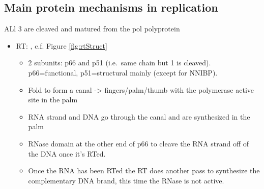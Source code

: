 \documentclass[
  11pt,
  twoside]{scrbook}
\begin{document}
\hypertarget{main-protein-mechanisms-in-replication}{%
\subsection{Main protein mechanisms in replication}\label{main-protein-mechanisms-in-replication}}

ALl 3 are cleaved and matured from the pol polyprotein

\begin{itemize}
\item
  RT: \autocite{sarafianosStructureFunctionHIV12009}, c.f. Figure \ref{fig:rtStruct}

  \begin{itemize}
  \item
    2 subunits: p66 and p51 (i.e.~same chain but 1 is cleaved). p66=functional, p51=structural mainly (except for NNIBP).
  \item
    Fold to form a canal -\textgreater{} fingers/palm/thumb with the polymerase active site in the palm
  \item
    RNA strand and DNA go through the canal and are synthesized in the palm
  \item
    RNase domain at the other end of p66 to cleave the RNA strand off of the DNA once it's RTed.
  \item
    Once the RNA has been RTed the RT does another pass to synthesize the complementary DNA brand, this time the RNase is not active.
  \end{itemize}
\end{itemize}
\end{document}
